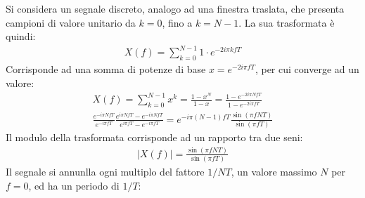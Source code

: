\documentclass{article}
\numberwithin{equation}{subsection}
\begin{document}
Si considera un segnale discreto, analogo ad una finestra traslata, che presenta campioni di valore unitario da $k=0$, fino a $k=N-1$. La sua trasformata è quindi:
\begin{gather*}
    X(f)=\displaystyle\sum_{k=0}^{N-1}1\cdot e^{-2i\pi kfT}
\end{gather*}
Corrisponde ad una somma di potenze di base $x=e^{-2i\pi fT}$, per cui converge ad un valore:
\begin{gather*}
    X(f)=\displaystyle\sum_{k=0}^{N-1}x^k=\frac{1-x^N}{1-x}=\frac{1-e^{-2i\pi NfT}}{1-e^{-2i\pi fT}}\\
    \frac{e^{-i\pi NfT}}{e^{-i\pi fT}}\frac{e^{i\pi NfT}-e^{-i\pi NfT}}{e^{i\pi fT}-e^{-i\pi fT}}=e^{-i\pi(N-1)fT}\frac{\sin(\pi fNT)}{\sin(\pi fT)}
\end{gather*}
Il modulo della trasformata corrisponde ad un rapporto tra due seni:
\begin{gather*}
    |X(f)|=\displaystyle\frac{\sin(\pi fNT)}{\sin(\pi fT)}
\end{gather*}
Il segnale si annunlla ogni multiplo del fattore $1/NT$, un valore massimo $N$ per $f=0$, ed ha un periodo di $1/T$:
\begin{center}
\end{center}
\end{document}
